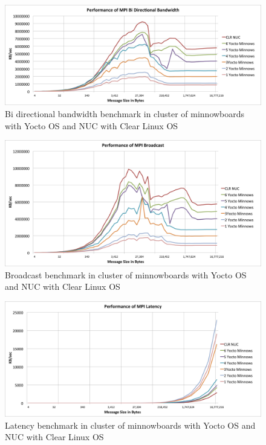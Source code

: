 \begin{figure}[H]
\centering
\includegraphics[width=1.0\textwidth]{images/mpbench_cluster_experiments/mpi_bibw.png}
\caption{Bi directional bandwidth benchmark in cluster of minnowboards with Yocto OS and NUC
with Clear Linux OS}
\label{all_to_all_cluster}
\end{figure}


\begin{figure}[H]
\centering
\includegraphics[width=1.0\textwidth]{images/mpbench_cluster_experiments/mpi_broadcast.png}
\caption{Broadcast  benchmark in cluster of minnowboards with Yocto OS and NUC
with Clear Linux OS}
\label{all_to_all_cluster}
\end{figure}

\begin{figure}[H]
\centering
\includegraphics[width=1.0\textwidth]{images/mpbench_cluster_experiments/mpi_latency.png}
\caption{Latency  benchmark in cluster of minnowboards with Yocto OS and NUC
with Clear Linux OS}
\label{all_to_all_cluster}
\end{figure}


